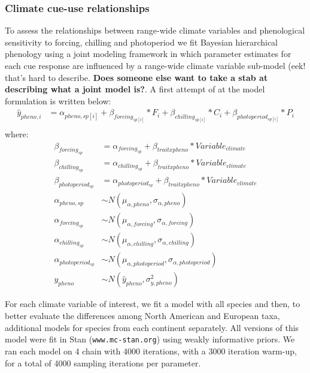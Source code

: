\documentclass[12pt]{article}\usepackage[]{graphicx}\usepackage[]{color}
\begin{document}
\subsubsection*{Climate cue-use relationships}
To assess the relationships between range-wide climate variables and phenological sensitivity to forcing, chilling and photoperiod we fit Bayesian hierarchical phenology using a joint modeling framework in which parameter estimates for each cue response are influenced by a range-wide climate variable sub-model (eek! that's hard to describe. \textbf{Does someone else want to take a stab at describing what a joint model is?}. A first attempt of at the model formulation is written below:\\

\begin{align*}

\hat{y}_{pheno, i} &= \alpha_{pheno, sp[i]} + \beta_{forcing_{sp[i]}}*F_i+\beta_{chilling_{sp[i]}}*C_i+\beta_{photoperiod_{sp[i]}}*P_i \\
\end{align*}
where:\\
\begin{align*}

\beta_{forcing_{sp}} & = \alpha_{forcing_{sp}} + \beta_{trait x pheno}*Variable_{climate} \\
\beta_{chilling_{sp}} & = \alpha_{chilling_{sp}} + \beta_{trait x pheno}*Variable_{climate} \\
\beta_{photoperiod_{sp}} & = \alpha_{photoperiod_{sp}} + \beta_{trait x pheno}*Variable_{climate} \\
\alpha_{pheno, sp} & \sim N(\mu_{\alpha, pheno}, \sigma_{\alpha, pheno}) \\
\alpha_{forcing_{sp}} & \sim N(\mu_{\alpha, forcing}, \sigma_{\alpha, forcing})\\
\alpha_{chilling_{sp}} & \sim N(\mu_{\alpha, chilling}, \sigma_{\alpha, chilling})\\
\alpha_{photoperiod_{sp}} & \sim N(\mu_{\alpha, photoperiod}, \sigma_{\alpha, photoperiod})\\
y_{pheno} & \sim N(\hat{y}_{pheno},\sigma^2_{y, pheno}) 

\end{align*}

For each climate variable of interest, we fit a model with all species and then, to better evaluate the differences among North American and European taxa, additional models for species from each continent separately. All versions of this model were fit in Stan \citep{Carpenter2017}(\texttt{www.mc-stan.org}) using weakly informative priors. We ran each model on 4 chain with 4000 iterations, with a 3000 iteration warm-up, for a total of 4000 sampling iterations per parameter. 
\end{document}
